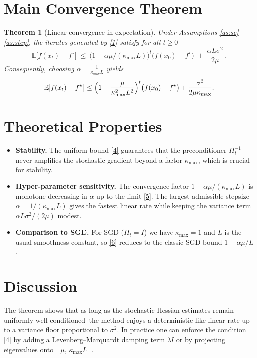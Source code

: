 \documentclass{article}
\newtheorem{theorem}{Theorem}
\newcommand{\E}{\mathbb{E}}
\begin{document}
\section*{Main Convergence Theorem}
\begin{theorem}[Linear convergence in expectation]\label{thm:linear}
Under Assumptions \ref{as:sc}–\ref{as:step}, the iterates generated by \eqref{1} satisfy for all $t\ge 0$
\[
\E\!\big[f(x_t)-f^\star\big]\;\le\;
\big(1-\alpha\mu/(\kappa_{\max}L)\big)^{t}\big(f(x_0)-f^\star\big)
\;+\;
\frac{\alpha L\sigma^2}{2\mu}\, .
\tag{6}
\]
Consequently, choosing $\displaystyle\alpha=\frac{1}{\kappa_{\max}L}$ yields 
\[
\E\!\big[f(x_t)-f^\star\big]\le
\Bigl(1-\frac{\mu}{\kappa_{\max}^2L^2}\Bigr)^{t}\big(f(x_0)-f^\star\big)
+\frac{\sigma^2}{2\mu\kappa_{\max}} .
\]
\end{theorem}

\section*{Theoretical Properties}
\begin{itemize}[leftmargin=*]
\item \textbf{Stability.} The uniform bound \eqref{4} guarantees that the preconditioner $H_t^{-1}$ never amplifies the stochastic gradient beyond a factor $\kappa_{\max}$, which is crucial for stability.
\item \textbf{Hyper‑parameter sensitivity.} The convergence factor $1-\alpha\mu/(\kappa_{\max}L)$ is monotone decreasing in $\alpha$ up to the limit \eqref{5}. The largest admissible stepsize $\alpha=1/(\kappa_{\max}L)$ gives the fastest linear rate while keeping the variance term $\alpha L\sigma^2/(2\mu)$ modest.
\item \textbf{Comparison to SGD.} For SGD ($H_t=I$) we have $\kappa_{\max}=1$ and $L$ is the usual smoothness constant, so \eqref{6} reduces to the classic SGD bound $1-\alpha\mu/L$.
\end{itemize}

\section*{Discussion}
The theorem shows that as long as the stochastic Hessian estimates remain uniformly well‑conditioned, the method enjoys a deterministic‑like linear rate up to a variance floor proportional to $\sigma^2$. In practice one can enforce the condition \eqref{4} by adding a Levenberg–Marquardt damping term $\lambda I$ or by projecting eigenvalues onto $[\mu,\,\kappa_{\max}L]$.
\end{document}
